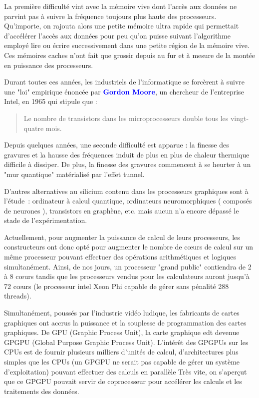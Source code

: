\documentclass[fleqn,11pt]{article}
\begin{document}
La première difficulté vint avec la mémoire vive dont l'accès aux données ne parvint pas à suivre la fréquence toujours plus haute des processeurs. Qu'importe, on rajouta alors une petite mémoire ultra rapide qui permettait d'accélérer l'accès aux données pour peu qu'on puisse suivant l'algorithme employé lire ou écrire successivement dans une petite région de la mémoire vive. Ces mémoires caches n'ont fait que grossir depuis au fur et à mesure de la montée en puissance des processeurs. 

Durant toutes ces années, les industriels de l'informatique se forcèrent à suivre une "loi" empirique énoncée par \textbf{\textcolor{blue}{Gordon Moore}}, un chercheur de l'entreprise Intel, en 1965 qui  stipule que :
\begin{quote}
Le nombre de transistors dans les microprocesseurs double tous les vingt-quatre mois.
\end{quote}

Depuis quelques années, une seconde difficulté est apparue : la finesse des gravures et la hausse des fréquences induit de plus en plus de chaleur thermique difficile à dissiper. De plus, la finesse des gravures commencent à se heurter à un "mur quantique" matérialisé par l'effet tunnel.

D'autres alternatives au silicium contenu dans les processeurs graphiques sont à l'étude~: ordinateur à calcul quantique, ordinateurs neuromorphiques ( composés de neurones ), transistors en graphène, etc. mais aucun n'a encore dépassé le stade de l'expérimentation. 

Actuellement, pour augmenter la puissance de calcul de leurs processeurs, les constructeurs ont donc opté pour augmenter le nombre de c{\oe}urs de calcul sur un même processeur pouvant effectuer des opérations arithmétiques et logiques simultanément. Ainsi,  de nos jours, un processeur "grand public" contiendra de 2 à 8 c{\oe}urs tandis que les processeurs vendus pour les calculateurs auront jusqu'à 72 c{\oe}urs (le processeur intel Xeon Phi capable de gérer sans pénalité 288 threads).

Simultanément, poussés par l'industrie vidéo ludique, les fabricants de cartes graphiques ont accrus la puissance et la souplesse de programmation des cartes graphiques. De GPU (Graphic Process Unit), la carte graphique edt devenue GPGPU (Global Purpose Graphic Process Unit). L'intérêt des GPGPUs sur les CPUs est de fournir plusieurs milliers d'unités de calcul, d'architectures plus simples que les CPUs (un GPGPU ne serait pas capable de gérer un système d'exploitation) pouvant effectuer des calculs en parallèle 
Très vite, on s'aperçut que ce GPGPU pouvait servir de coprocesseur pour accélérer les calculs et les traitements des données. 
\end{document}
